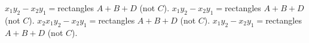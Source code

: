 \(x_{1}y_{2}-x_{2}y_{1}=\)rectangles \(A+B+D\) (not \(C\)). \(x_{1}y_{2}-x_{2}y_{1}=\)rectangles \(A+B+D\) (not \(C\)). \(x_{2}\)\(x_{1}\)\(y_{2}-x_{2}y_{1}=\)rectangles \(A+B+D\) (not \(C\)). \(x_{1}\)\(y_{2}-x_{2}y_{1}=\)rectangles \(A+B+D\) (not \(C\)).

 